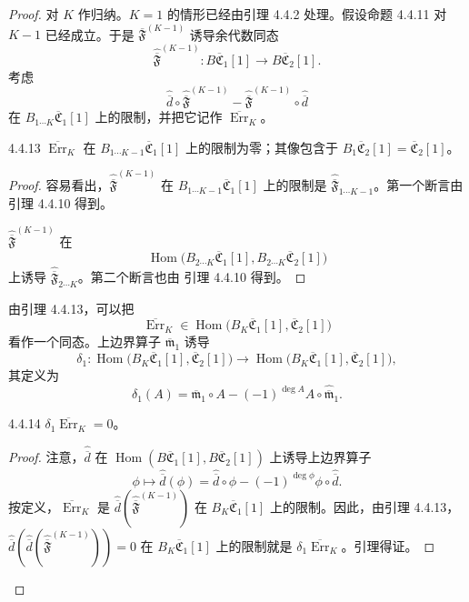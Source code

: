 \begin{proof}
对 $K$ 作归纳。$K=1$ 的情形已经由引理 4.4.2 处理。假设命题
4.4.11 对 $K-1$ 已经成立。于是
$\overline{\mathfrak F}^{(K-1)}$ 诱导余代数同态
\[
 \widehat{\overline{\mathfrak F}}^{(K-1)}\colon
 B\overline{\mathfrak C}_1[1]
 \longrightarrow B\overline{\mathfrak C}_2[1].
\]
考虑
\begin{equation}
 \widehat{\overline d}
 \circ\widehat{\overline{\mathfrak F}}^{(K-1)}
 -\widehat{\overline{\mathfrak F}}^{(K-1)}
 \circ\widehat{\overline d}
\tag{4.4.12}\label{eq:4-4-12}
\end{equation}
在 $B_{1\cdots K}\overline{\mathfrak C}_1[1]$ 上的限制，并把它记作
$\overline{\operatorname{Err}}_K$。

\begin{lemma}{4.4.13}\label{lem:4-4-13}
$\overline{\operatorname{Err}}_K$ 在
$B_{1\cdots K-1}\overline{\mathfrak C}_1[1]$ 上的限制为零；其像包含于
$B_1\overline{\mathfrak C}_2[1]=\overline{\mathfrak C}_2[1]$。
\end{lemma}

\begin{proof}
容易看出，$\widehat{\overline{\mathfrak F}}^{(K-1)}$ 在
$B_{1\cdots K-1}\overline{\mathfrak C}_1[1]$ 上的限制是
$\widehat{\overline{\mathfrak F}}_{1\cdots K-1}$。第一个断言由引理
4.4.10 得到。

$\widehat{\overline{\mathfrak F}}^{(K-1)}$ 在
\[
 \operatorname{Hom}\bigl(
 B_{2\cdots K}\overline{\mathfrak C}_1[1],
 B_{2\cdots K}\overline{\mathfrak C}_2[1]
 \bigr)
\]
上诱导 $\widehat{\overline{\mathfrak F}}_{2\cdots K}$。第二个断言也由
引理 4.4.10 得到。
\end{proof}

由引理 4.4.13，可以把
\[
 \overline{\operatorname{Err}}_K
 \in\operatorname{Hom}\bigl(
 B_K\overline{\mathfrak C}_1[1],
 \overline{\mathfrak C}_2[1]
 \bigr)
\]
看作一个同态。上边界算子 $\overline{\mathfrak m}_1$ 诱导
\[
 \delta_1\colon
 \operatorname{Hom}\bigl(
 B_K\overline{\mathfrak C}_1[1],
 \overline{\mathfrak C}_2[1]
 \bigr)
 \longrightarrow
 \operatorname{Hom}\bigl(
 B_K\overline{\mathfrak C}_1[1],
 \overline{\mathfrak C}_2[1]
 \bigr),
\]
其定义为
\[
 \delta_1(A)
 =\overline{\mathfrak m}_1\circ A
 -(-1)^{\deg A}A\circ\widehat{\overline{\mathfrak m}}_1.
\]

\begin{lemma}{4.4.14}\label{lem:4-4-14}
$\delta_1\overline{\operatorname{Err}}_K=0$。
\end{lemma}

\begin{proof}
注意，$\widehat{\overline d}$ 在
$\operatorname{Hom}(B\overline{\mathfrak C}_1[1],
B\overline{\mathfrak C}_2[1])$ 上诱导上边界算子
\[
 \phi\longmapsto
 \widehat{\overline d}(\phi)
 =\widehat{\overline d}\circ\phi
 -(-1)^{\deg\phi}\phi\circ\widehat{\overline d}.
\]
按定义，$\overline{\operatorname{Err}}_K$ 是
$\widehat{\overline d}
(\widehat{\overline{\mathfrak F}}^{(K-1)})$ 在
$B_K\overline{\mathfrak C}_1[1]$ 上的限制。因此，由引理 4.4.13，
$\widehat{\overline d}
(\widehat{\overline d}
(\widehat{\overline{\mathfrak F}}^{(K-1)}))=0$ 在
$B_K\overline{\mathfrak C}_1[1]$ 上的限制就是
$\delta_1\overline{\operatorname{Err}}_K$。引理得证。
\end{proof}


\end{proof}
